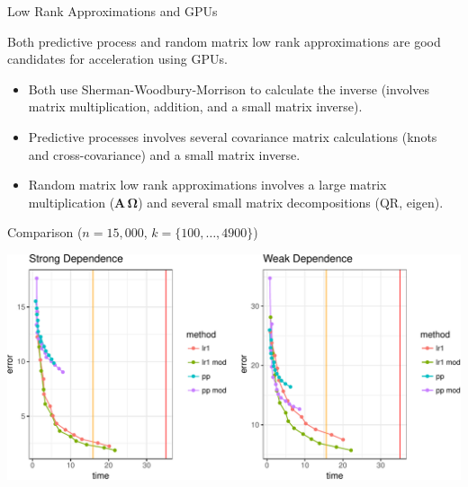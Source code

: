 \documentclass[11pt,ignorenonframetext,]{beamer}
\providecommand{\tightlist}{%
  \setlength{\itemsep}{0pt}\setlength{\parskip}{0pt}}
\begin{document}
\begin{frame}{Low Rank Approximations and GPUs}

Both predictive process and random matrix low rank approximations are
good candidates for acceleration using GPUs.

\vspace{3mm}

\begin{itemize}
\tightlist
\item
  Both use Sherman-Woodbury-Morrison to calculate the inverse (involves
  matrix multiplication, addition, and a small matrix inverse).
\end{itemize}

\vspace{3mm}

\begin{itemize}
\tightlist
\item
  Predictive processes involves several covariance matrix calculations
  (knots and cross-covariance) and a small matrix inverse.
\end{itemize}

\vspace{3mm}

\begin{itemize}
\tightlist
\item
  Random matrix low rank approximations involves a large matrix
  multiplication (\(\bm{A}\,\bm{\Omega}\)) and several small matrix
  decompositions (QR, eigen).
\end{itemize}

\end{frame}

\begin{frame}{Comparison (\(n=15,000\), \(k=\{100,\ldots,4900\}\))}

\includegraphics{Lec22_files/figure-beamer/unnamed-chunk-16-1.pdf}

\end{frame}
\end{document}
